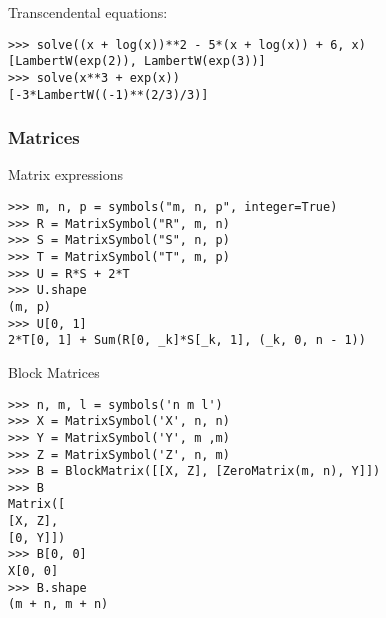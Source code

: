 \noindent Transcendental equations:
\begin{verbatim}
>>> solve((x + log(x))**2 - 5*(x + log(x)) + 6, x)
[LambertW(exp(2)), LambertW(exp(3))]
>>> solve(x**3 + exp(x))
[-3*LambertW((-1)**(2/3)/3)]
\end{verbatim}

\subsubsection{Matrices}

\noindent Matrix expressions
\begin{verbatim}
>>> m, n, p = symbols("m, n, p", integer=True)
>>> R = MatrixSymbol("R", m, n)
>>> S = MatrixSymbol("S", n, p)
>>> T = MatrixSymbol("T", m, p)
>>> U = R*S + 2*T
>>> U.shape
(m, p)
>>> U[0, 1]
2*T[0, 1] + Sum(R[0, _k]*S[_k, 1], (_k, 0, n - 1))
\end{verbatim}

\noindent Block Matrices
\begin{verbatim}
>>> n, m, l = symbols('n m l')
>>> X = MatrixSymbol('X', n, n)
>>> Y = MatrixSymbol('Y', m ,m)
>>> Z = MatrixSymbol('Z', n, m)
>>> B = BlockMatrix([[X, Z], [ZeroMatrix(m, n), Y]])
>>> B
Matrix([
[X, Z],
[0, Y]])
>>> B[0, 0]
X[0, 0]
>>> B.shape
(m + n, m + n)
\end{verbatim}
